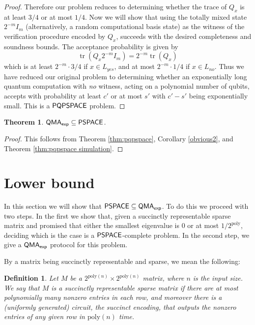 \documentclass[11pt]{article}
\newtheorem{theorem}{Theorem}
\newtheorem{definition}{Definition}
\theoremstyle{definition}
\theoremstyle{remark}
\newcommand\PSPACE{{\sf{PSPACE}}}
\newcommand\QMAexp{{\sf{QMA}_{exp}}}
\newcommand\PQPSPACE{{\sf{PQPSPACE}}}
\DeclareMathOperator{\tr}{tr}
\newcommand{\poly}{\textrm{poly}}
\begin{document}
\begin{proof}
Therefore our problem reduces to determining whether the trace of $Q_x$ is at least $3/4$ or at most $1/4$.  Now we will show that using the totally mixed state $2^{-m}I_m$ (alternatively, a random computational basis state) as the witness of the verification procedure encoded by $Q_x$, succeeds with the desired completeness and soundness bounds.  The acceptance probability is given by
\begin{equation}
\tr(Q_x 2^{-m}I_m) = 2^{-m} \tr(Q_x)
\end{equation}
which is at least $2^{-m} \cdot 3/4$ if $x\in L_{yes}$, and at most $2^{-m} \cdot 1/4$ if $x\in L_{no}$. Thus we have reduced our original problem to determining whether an exponentially long quantum computation with \emph{no} witness, acting on a polynomial number of qubits, accepts with probability at least $c'$ or at most $s'$ with $c' - s'$ being exponentially small. This is a $\PQPSPACE$ problem.

\end{proof}
\begin{theorem}
$\QMAexp\subseteq\PSPACE$.
\end{theorem}
\begin{proof}
This follows from Theorem \ref{thm:pqpspace}, Corollary \ref{obvious2}, and Theorem \ref{thm:pqpspace simulation}.
\end{proof}

\section{Lower bound}
In this section we will show that $\PSPACE\subseteq\QMAexp$.  To do this we proceed with two steps.  In the first we show that, given a succinctly representable sparse matrix and promised that either the smallest eigenvalue is 0 or at most $1/2^{\poly}$, deciding which is the case is a $\PSPACE$-complete problem.  In the second step, we give a $\QMAexp$ protocol for this problem.

By a matrix being succinctly representable and sparse, we mean the following:
\begin{definition}
Let $M$ be a $2^{\poly(n)} \times 2^{\poly(n)}$ matrix, where $n$ is the input size. We say that $M$ is a \emph{succinctly representable sparse} matrix if there are at most polynomially many nonzero entries in each row, and moreover there is a (uniformly generated) circuit, \emph{the succinct encoding}, that outputs the nonzero entries of any given row in $\poly(n)$ time.
\end{definition}
\end{document}
